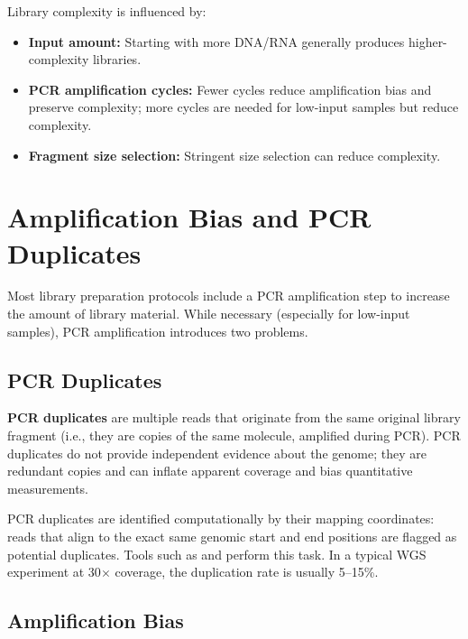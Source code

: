 Library complexity is influenced by:
\begin{itemize}[itemsep=2pt]
  \item \textbf{Input amount:} Starting with more DNA/RNA generally produces higher-complexity libraries.
  \item \textbf{PCR amplification cycles:} Fewer cycles reduce amplification bias and preserve complexity; more cycles are needed for low-input samples but reduce complexity.
  \item \textbf{Fragment size selection:} Stringent size selection can reduce complexity.
\end{itemize}


\section{Amplification Bias and PCR Duplicates}
\label{sec:seqprinciples:pcr-bias}

Most library preparation protocols include a \acrshort{PCR} amplification step to increase the amount of library material. While necessary (especially for low-input samples), PCR amplification introduces two problems.

\subsection{PCR Duplicates}
\label{subsec:seqprinciples:pcr-duplicates}

\textbf{PCR duplicates} are multiple reads that originate from the same original library fragment (i.e., they are copies of the same molecule, amplified during PCR). PCR duplicates do not provide independent evidence about the genome; they are redundant copies and can inflate apparent coverage and bias quantitative measurements.

PCR duplicates are identified computationally by their mapping coordinates: reads that align to the exact same genomic start and end positions are flagged as potential duplicates. Tools such as  and  perform this task. In a typical WGS experiment at 30$\times$ coverage, the duplication rate is usually 5--15\%.

\subsection{Amplification Bias}
\label{subsec:seqprinciples:amplification-bias}


